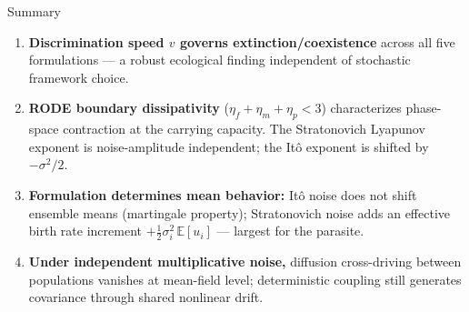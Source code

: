 \documentclass{beamer}
\newcommand{\E}{\mathbb{E}}
\begin{document}
\begin{frame}{Summary}

  \begin{enumerate}
    \item[(a)] \textbf{Discrimination speed $v$ governs extinction/coexistence}
      across all five formulations --- a robust ecological finding independent
      of stochastic framework choice.

    \vspace{0.2cm}
    \item[(b)] \textbf{RODE boundary dissipativity} ($\eta_f+\eta_m+\eta_p < 3$)
      characterizes phase-space contraction at the carrying capacity.
      The Stratonovich Lyapunov exponent is noise-amplitude independent;
      the It\^{o} exponent is shifted by $-\sigma^2/2$.

    \vspace{0.2cm}
    \item[(c)] \textbf{Formulation determines mean behavior:}
      It\^{o} noise does not shift ensemble means (martingale property);
      Stratonovich noise adds an effective birth rate increment
      $+\tfrac{1}{2}\sigma_i^2\,\E[u_i]$ --- largest for the parasite.

    \vspace{0.2cm}
    \item[(d)] \textbf{Under independent multiplicative noise,}
      diffusion cross-driving between populations vanishes at mean-field
      level; deterministic coupling still generates covariance through
      shared nonlinear drift.
  \end{enumerate}

\end{frame}
\end{document}
